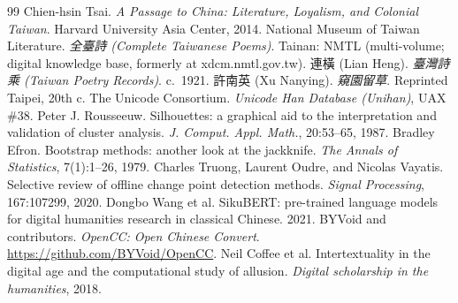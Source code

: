 \documentclass[10pt,twocolumn]{article}
\begin{document}
\begin{thebibliography}{99}
\footnotesize
{} Chien-hsin Tsai. \emph{A Passage to China: Literature, Loyalism, and
Colonial Taiwan}. Harvard University Asia Center, 2014.
 National Museum of Taiwan Literature. \emph{全臺詩 (Complete Taiwanese Poems)}.
Tainan: NMTL (multi-volume; digital knowledge base, formerly at xdcm.nmtl.gov.tw).
 連橫 (Lian Heng). \emph{臺灣詩乘 (Taiwan Poetry Records)}. c.\ 1921.
 許南英 (Xu Nanying). \emph{窺園留草}. Reprinted Taipei, 20th c.
 The Unicode Consortium. \emph{Unicode Han Database (Unihan)}, UAX \#38.
 Peter J. Rousseeuw. Silhouettes: a graphical aid to the
interpretation and validation of cluster analysis. \emph{J. Comput. Appl. Math.},
20:53--65, 1987.
 Bradley Efron. Bootstrap methods: another look at the jackknife.
\emph{The Annals of Statistics}, 7(1):1--26, 1979.
 Charles Truong, Laurent Oudre, and Nicolas Vayatis. Selective review of
offline change point detection methods. \emph{Signal Processing}, 167:107299, 2020.
 Dongbo Wang et al. SikuBERT: pre-trained language models for digital
humanities research in classical Chinese. 2021.
 BYVoid and contributors. \emph{OpenCC: Open Chinese Convert}.
\url{https://github.com/BYVoid/OpenCC}.
 Neil Coffee et al. Intertextuality in the digital age and the
computational study of allusion. \emph{Digital scholarship in the humanities}, 2018.
\end{thebibliography}
\end{document}
